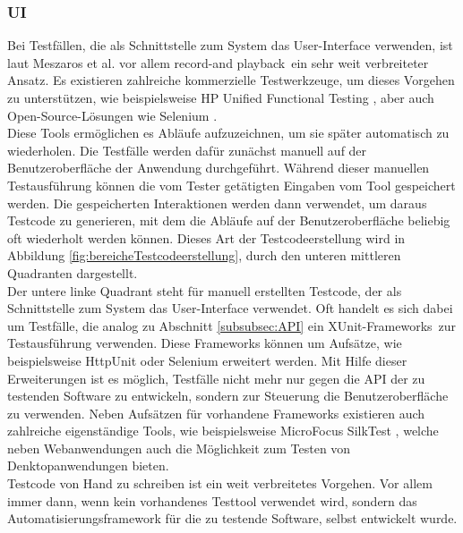 \subsubsection{UI}
\label{subsubsec:UI}
Bei Testfällen, die als Schnittstelle zum System das User-Interface verwenden, ist laut  Meszaros et al. \cite{meszaros_agile_2003} vor allem \grq record-and playback\grq\ ein sehr weit verbreiteter Ansatz. Es existieren zahlreiche kommerzielle Testwerkzeuge, um dieses Vorgehen zu unterstützen, wie beispielsweise HP Unified Functional Testing \cite{hp_testautomatisierung_2015}, aber auch Open-Source-Lösungen wie Selenium \cite{selenium_selenium_2015}.\\
Diese Tools ermöglichen es Abläufe aufzuzeichnen, um sie später automatisch zu wiederholen. Die Testfälle werden dafür zunächst manuell auf der Benutzeroberfläche der Anwendung durchgeführt. Während dieser manuellen Testausführung können die vom Tester getätigten Eingaben vom Tool gespeichert werden. Die gespeicherten Interaktionen werden dann verwendet, um daraus Testcode zu generieren, mit dem die Abläufe auf der Benutzeroberfläche beliebig oft wiederholt werden können. Dieses Art der Testcodeerstellung wird in Abbildung \ref{fig:bereicheTestcodeerstellung}, durch den unteren mittleren Quadranten dargestellt.\\
Der untere linke Quadrant steht für manuell erstellten Testcode, der als Schnittstelle zum System das User-Interface verwendet. Oft handelt es sich dabei um Testfälle, die analog zu Abschnitt \ref{subsubsec:API} ein \grq XUnit-Frameworks\grq\ zur Testausführung verwenden. Diese Frameworks können um Aufsätze, wie beispielsweise HttpUnit \cite{httpunit_httpunit_2015} oder Selenium \cite{selenium_selenium_2015} erweitert werden. Mit Hilfe dieser Erweiterungen ist es möglich, Testfälle nicht mehr nur gegen die API der zu testenden Software zu entwickeln, sondern zur Steuerung die Benutzeroberfläche zu verwenden. Neben Aufsätzen für vorhandene Frameworks existieren auch zahlreiche eigenständige Tools, wie beispielsweise MicroFocus SilkTest \cite{silk_test_borland_2015}, welche neben Webanwendungen auch die Möglichkeit zum Testen von Denktopanwendungen bieten.\\
Testcode von Hand zu schreiben ist ein weit verbreitetes Vorgehen. Vor allem immer dann, wenn kein vorhandenes Testtool verwendet wird, sondern das Automatisierungsframework für die zu testende Software, selbst entwickelt wurde.


